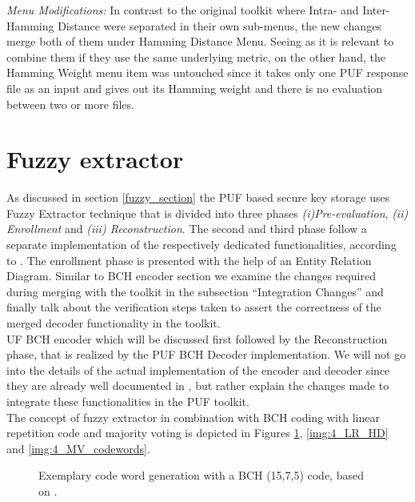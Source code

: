 \emph{Menu Modifications:} In contrast to the original toolkit where Intra- and Inter-Hamming Distance were separated in their own sub-menus, the new changes merge both of them under Hamming Distance Menu. Seeing as it is relevant to combine them if they use the same underlying metric, on the other hand, the Hamming Weight menu item was untouched since it takes only one PUF response file as an input and gives out its Hamming weight and there is no evaluation between two or
more files.\\


\section{Fuzzy extractor}
As discussed in section \ref{fuzzy_section} the PUF based secure key storage uses Fuzzy Extractor technique that is divided into three phases \emph{(i)Pre-evaluation}, \emph{(ii) Enrollment} and \emph{(iii) Reconstruction}. The second and third phase follow a separate implementation of the respectively dedicated functionalities, according to \cite{10}. The enrollment phase is presented with the help of an Entity Relation Diagram. Similar to BCH encoder
section we examine the changes required during merging with the toolkit in the subsection ``Integration Changes'' and finally talk about the verification steps taken to assert the correctness of the merged decoder functionality in the toolkit.\\UF BCH encoder which will be discussed first followed by the Reconstruction phase, that is
realized by the PUF BCH Decoder implementation. We will not go into the details of the actual implementation of the encoder and decoder since they are already well documented in \cite{71}, but rather explain the changes made to integrate these functionalities in the PUF toolkit.\\

The concept of fuzzy extractor in combination with BCH coding with linear repetition code and majority voting is depicted in Figures \ref{img:4_BCH_concept}, \ref{img:4_LR_HD} and \ref{img:4_MV_codewords}.

\begin{figure}[h]
\centering
{}
\caption{Exemplary code word generation with a BCH (15,7,5) code, based on \cite{10}.}
\label{img:4_BCH_concept}
\end{figure}

